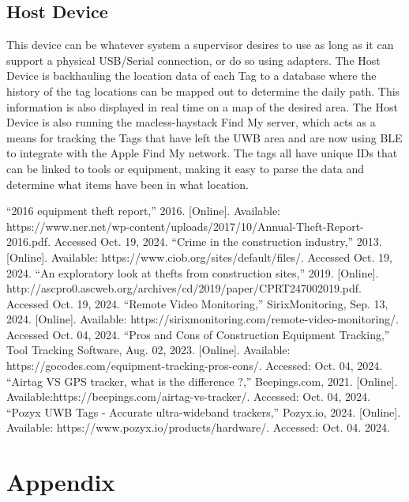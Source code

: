 \documentclass[conference]{IEEEtran}
\begin{document}
\subsection{Host Device}

This device can be whatever system a supervisor desires to use as long as 
it can support a physical USB/Serial connection, or do so using adapters. 
The Host Device is backhauling the location data of each Tag to a database 
where the history of the tag locations can be mapped out to determine the 
daily path. This information is also displayed in real time on a map of 
the desired area. The Host Device is also running the macless-haystack 
Find My server, which acts as a means for tracking the Tags that have 
left the UWB area and are now using BLE to integrate with the Apple Find 
My network. The tags all have unique IDs that can be linked to tools or 
equipment, making it easy to parse the data and determine what items have 
been in what location. 


\begin{thebibliography}{00}
 ``2016 equipment theft report,'' 2016. [Online]. Available: https://www.ner.net/wp-content/uploads/2017/10/Annual-Theft-Report-2016.pdf. Accessed Oct. 19, 2024.
 ``Crime in the construction industry,'' 2013. [Online]. Available: https://www.ciob.org/sites/default/files/. Accessed Oct. 19, 2024.
 ``An exploratory look at thefts from construction sites,'' 2019. [Online]. http://ascpro0.ascweb.org/archives/cd/2019/paper/CPRT247002019.pdf. Accessed Oct. 19, 2024.
 ``Remote Video Monitoring,'' SirixMonitoring, Sep. 13, 2024. [Online]. Available: https://sirixmonitoring.com/remote-video-monitoring/. Accessed Oct. 04, 2024.
 ``Pros and Cons of Construction Equipment Tracking,'' Tool Tracking Software, Aug. 02, 2023. [Online]. Available:  https://gocodes.com/equipment-tracking-pros-cons/. Accessed: Oct. 04, 2024.
 ``Airtag VS GPS tracker, what is the difference ?,'' Beepings.com, 2021. [Online]. Available:https://beepings.com/airtag-vs-tracker/. Accessed: Oct. 04, 2024.
 ``Pozyx UWB Tags - Accurate ultra-wideband trackers,'' Pozyx.io, 2024. [Online]. Available: https://www.pozyx.io/products/hardware/. Accessed: Oct. 04. 2024.
\end{thebibliography}
\vspace{12pt}

\section*{Appendix}
\setcounter{subsection}{0}
\end{document}

